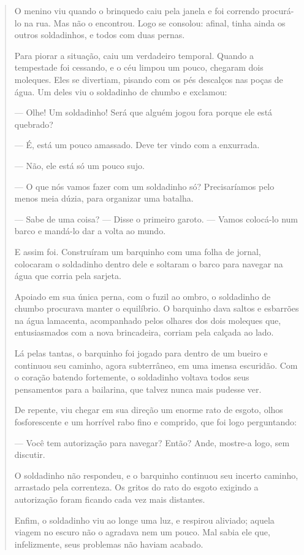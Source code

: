 \begin{quote}
O menino viu quando o brinquedo caiu pela janela e foi correndo
procurá-lo na rua. Mas não o encontrou. Logo se consolou: afinal, tinha
ainda os outros soldadinhos, e todos com duas pernas.

Para piorar a situação, caiu um verdadeiro temporal. Quando a tempestade
foi cessando, e o céu limpou um pouco, chegaram dois moleques. Eles se
divertiam, pisando com os pés descalços nas poças de água. Um deles viu
o soldadinho de chumbo e exclamou:

--- Olhe! Um soldadinho! Será que alguém jogou fora porque ele está
quebrado?

--- É, está um pouco amassado. Deve ter vindo com a enxurrada.

--- Não, ele está só um pouco sujo.

--- O que nós vamos fazer com um soldadinho só? Precisaríamos pelo menos
meia dúzia, para organizar uma batalha.

--- Sabe de uma coisa? --- Disse o primeiro garoto. --- Vamos colocá-lo
num barco e mandá-lo dar a volta ao mundo.

E assim foi. Construíram um barquinho com uma folha de jornal, colocaram
o soldadinho dentro dele e soltaram o barco para navegar na água que
corria pela sarjeta.

Apoiado em sua única perna, com o fuzil ao ombro, o soldadinho de chumbo
procurava manter o equilíbrio. O barquinho dava saltos e esbarrões na
água lamacenta, acompanhado pelos olhares dos dois moleques que,
entusiasmados com a nova brincadeira, corriam pela calçada ao lado.

Lá pelas tantas, o barquinho foi jogado para dentro de um bueiro e
continuou seu caminho, agora subterrâneo, em uma imensa escuridão. Com o
coração batendo fortemente, o soldadinho voltava todos seus pensamentos
para a bailarina, que talvez nunca mais pudesse ver.

De repente, viu chegar em sua direção um enorme rato de esgoto, olhos
fosforescente e um horrível rabo fino e comprido, que foi logo
perguntando:

--- Você tem autorização para navegar? Então? Ande, mostre-a logo, sem
discutir.

O soldadinho não respondeu, e o barquinho continuou seu incerto caminho,
arrastado pela correnteza. Os gritos do rato do esgoto exigindo a
autorização foram ficando cada vez mais distantes.

Enfim, o soldadinho viu ao longe uma luz, e respirou aliviado; aquela
viagem no escuro não o agradava nem um pouco. Mal sabia ele que,
infelizmente, seus problemas não haviam acabado.


\end{quote}
